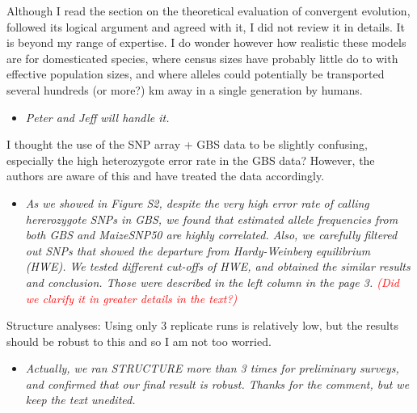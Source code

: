 \documentclass[onecolumn,oneside,letterpaper]{article}
\newcommand{\comst}[1]{\textcolor{red}{ \em{\scriptsize  (#1)}} }
\begin{document}
Although I read the section on the theoretical evaluation of convergent evolution, followed its logical argument and agreed with it, I did not review it in details.  It is beyond my range of expertise.  I do wonder however how realistic these models are for domesticated species, where census sizes have probably little do to with effective population sizes, and where alleles could potentially be transported several hundreds (or more?) km away in a single generation by humans.  
\setlength{\parskip}{-5.0pt}
\begin{itemize}
\item \textit{ Peter and Jeff will handle it. }
\end{itemize}
\setlength{\parskip}{10.0pt}

I thought the use of the SNP array + GBS data to be slightly confusing, especially the high heterozygote error rate in the GBS data? However, the authors are aware of this and have treated the data accordingly.  
\setlength{\parskip}{-5.0pt}
\begin{itemize}
\item \textit{ As we showed in Figure S2, despite the very high error rate of calling hererozygote SNPs in GBS, we found that estimated allele frequencies from both GBS and MaizeSNP50 are highly correlated.  Also, we carefully filtered out SNPs that showed the departure from Hardy-Weinberg equilibrium (HWE).  We tested different cut-offs of HWE, and obtained the similar results and conclusion.  Those were described in the left column in the page 3.  \comst{Did we clarify it in greater details in the text?} }
\end{itemize}
\setlength{\parskip}{10.0pt}  

Structure analyses:  Using only 3 replicate runs is relatively low, but the results should be robust to this and so I am not too worried.  
\setlength{\parskip}{-5.0pt}
\begin{itemize}
\item \textit{ Actually, we ran STRUCTURE more than 3 times for preliminary surveys, and confirmed that our final result is robust.  Thanks for the comment, but we keep the text unedited. }
\end{itemize}
\setlength{\parskip}{10.0pt}
\end{document}
